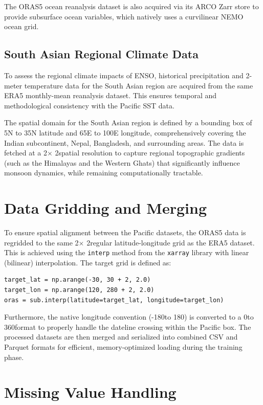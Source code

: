 The ORAS5 ocean reanalysis dataset is also acquired via its ARCO Zarr store to provide subsurface ocean variables, which natively uses a curvilinear NEMO ocean grid.

\subsection{South Asian Regional Climate Data}

To assess the regional climate impacts of ENSO, historical precipitation and 2-meter temperature data for the South Asian region are acquired from the same ERA5 monthly-mean reanalysis dataset. This ensures temporal and methodological consistency with the Pacific SST data.

The spatial domain for the South Asian region is defined by a bounding box of 5\degree N to 35\degree N latitude and 65\degree E to 100\degree E longitude, comprehensively covering the Indian subcontinent, Nepal, Bangladesh, and surrounding areas. The data is fetched at a 2\degree $\times$ 2\degree spatial resolution to capture regional topographic gradients (such as the Himalayas and the Western Ghats) that significantly influence monsoon dynamics, while remaining computationally tractable.

\section{Data Gridding and Merging}

To ensure spatial alignment between the Pacific datasets, the ORAS5 data is regridded to the same 2\degree $\times$ 2\degree regular latitude-longitude grid as the ERA5 dataset. This is achieved using the \texttt{interp} method from the \texttt{xarray} library with linear (bilinear) interpolation. The target grid is defined as:

\begin{verbatim}
target_lat = np.arange(-30, 30 + 2, 2.0)
target_lon = np.arange(120, 280 + 2, 2.0)
oras = sub.interp(latitude=target_lat, longitude=target_lon)
\end{verbatim}

Furthermore, the native longitude convention (-180\degree to 180\degree) is converted to a 0\degree to 360\degree format to properly handle the dateline crossing within the Pacific box. The processed datasets are then merged and serialized into combined CSV and Parquet formats for efficient, memory-optimized loading during the training phase.

\section{Missing Value Handling}

